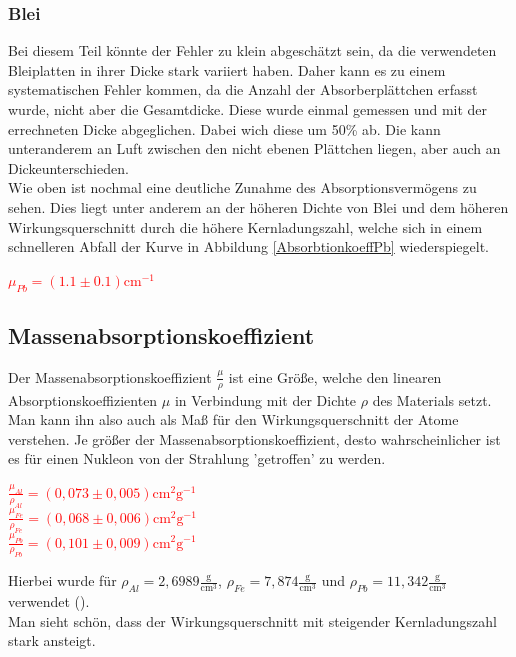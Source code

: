 \subsubsection*{Blei}

Bei diesem Teil könnte der Fehler zu klein abgeschätzt sein, da die verwendeten Bleiplatten in ihrer Dicke stark variiert haben. Daher kann es zu einem 
systematischen Fehler kommen, da die Anzahl der Absorberplättchen erfasst wurde, nicht aber die Gesamtdicke. Diese wurde einmal gemessen und mit der 
errechneten Dicke abgeglichen. Dabei wich diese um 50\% ab. Die kann unteranderem an Luft zwischen den nicht ebenen Plättchen liegen, aber auch an Dickeunterschieden.\\
Wie oben ist nochmal eine deutliche Zunahme des Absorptionsvermögens zu sehen. Dies liegt unter anderem an der höheren Dichte von Blei und dem höheren 
Wirkungsquerschnitt durch die höhere Kernladungszahl, welche sich in einem schnelleren Abfall der Kurve in Abbildung \ref{AbsorbtionkoeffPb} wiederspiegelt.

\begin{center}
    \centering
    \textcolor{red}{$\mu_{Pb}= (1.1\pm 0.1) \mathrm{cm}^{-1}$}
\end{center}

\subsection{Massenabsorptionskoeffizient}

Der Massenabsorptionskoeffizient $\frac{\mu}{\rho}$ ist eine Größe, welche den linearen Absorptionskoeffizienten $\mu$ in Verbindung mit der Dichte $\rho$ des Materials setzt.
Man kann ihn also auch als Maß für den Wirkungsquerschnitt der Atome verstehen. Je größer der Massenabsorptionskoeffizient, desto wahrscheinlicher ist es für einen 
Nukleon von der Strahlung 'getroffen' zu werden. 

\begin{center}
    \centering
    \textcolor{red}{$\frac{\mu_{Al}}{\rho_{Al}} = (0,073 \pm 0,005) \mathrm{cm}^{2} \mathrm{g}^{-1}$}\\
    \textcolor{red}{$\frac{\mu_{Fe}}{\rho_{Fe}}= (0,068 \pm 0,006) \mathrm{cm}^{2} \mathrm{g}^{-1}$}\\
    \textcolor{red}{$\frac{\mu_{Pb}}{\rho_{Pb}}= (0,101 \pm 0,009) \mathrm{cm}^{2} \mathrm{g}^{-1}$}\\
\end{center}

Hierbei wurde für $\rho_{Al} = 	2,6989 \frac{\mathrm{g}}{\mathrm{cm}^3}$, $\rho_{Fe} = 	7,874 
\frac{\mathrm{g}}{\mathrm{cm}^3}$ und
$\rho_{Pb} = 11,342 \frac{\mathrm{g}}{\mathrm{cm}^3}$  verwendet (\cite{CRC1990}).\\
Man sieht schön, dass der Wirkungsquerschnitt mit steigender Kernladungszahl stark ansteigt.


